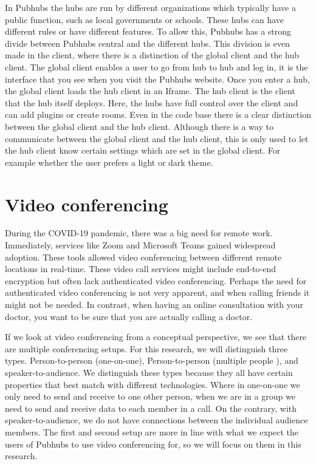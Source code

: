 \documentclass{report}
\begin{document}
In Pubhubs the hubs are run by different organizations which typically have a public function, such as
local governments or schools.
These hubs can have different rules or have different features.
To allow this, Pubhubs has a strong divide between Pubhubs central and the different hubs.
This division is even made in the client, where there is a distinction of the global client and the hub client.
The global client enables a user to go from hub to hub and log in, it is
the interface that you see when you visit the Pubhubs website.
Once you enter a hub, the global client loads the hub client in an Iframe. The hub client
is the client that the hub itself deploys. Here, the hubs have full control
over the client and can add plugins or create rooms.
Even in the code base there is a clear distinction between the global client and the hub client.
Although there is a way to communicate between the global client and the hub client, this
is only used to let the hub client know certain settings which are set in the global client.
For example whether the user prefers a light or dark theme.


\section{Video conferencing}
During the COVID-19 pandemic, there was a big need for remote work. Immediately, services like Zoom \cite{Zoom}
and Microsoft Teams  \cite{MSTeams}
gained widespread adoption. These tools allowed video conferencing between different remote locations in real-time.
These video call services might include end-to-end encryption but often lack authenticated video conferencing.
Perhaps the need for authenticated video conferencing is not very apparent, and when calling friends it might not be
needed. In contrast, when having an online consultation with your doctor, you want to be sure that you are actually
calling a doctor.


If we look at video conferencing from a conceptual perspective, we see that there are multiple conferencing setups.
For this research, we will distinguish three types. Person-to-person (one-on-one), Person-to-person (multiple people
), and speaker-to-audience. We distinguish these types because they all have certain properties that best match with
different technologies. Where in one-on-one we only need to send and receive to one other person, when we are in a
group we need to send and receive data to each member in a call. On the contrary, with speaker-to-audience, we do
not have connections between the individual audience members. The first and second setup are more in line with what
we expect the users of Pubhubs to use video conferencing for, so we will focus on them in this research.
\end{document}
